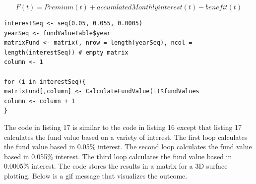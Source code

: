 \documentclass[12pt]{article}
\begin{document}
\begin{equation}
F(t)= Premium (t)+ accumlatedMonthlyinterest(t)- benefit(t)
\end{equation}
\begin{lstlisting}[caption={Calculating The Fund Value Based on Different Interests},captionpos=b]
interestSeq <- seq(0.05, 0.055, 0.0005)
yearSeq <- fundValueTable$year
matrixFund <- matrix(, nrow = length(yearSeq), ncol = length(interestSeq)) # empty matrix
column <- 1

for (i in interestSeq){
matrixFund[,column] <- CalculateFundValue(i)$fundValues
column <- column + 1
}
\end{lstlisting}
The code in listing 17 is similar to the code in listing 16 except that listing 17 calculates the fund value based on a variety of interest. The first loop calculates the fund value based in 0.05\% interest. The second loop calculates the fund value based in 0.055\% interest. The third loop calculates the fund value based in 0.0005\% interest. The code stores the results in a matrix for a 3D surface plotting. Below is a gif message that visualizes the outcome.

\end{document}
